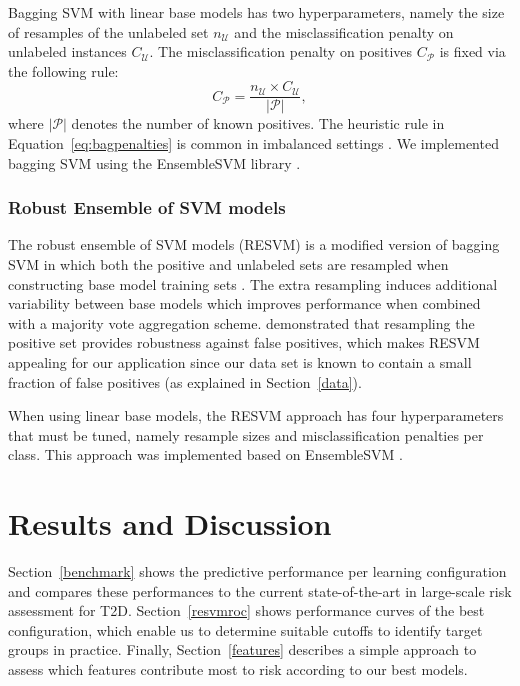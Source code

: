 \documentclass[twoside,11pt]{article}
\begin{document}
Bagging SVM with linear base models has two hyperparameters, namely the size of resamples of the unlabeled set $n_\mathcal{U}$ and the misclassification penalty on unlabeled instances $C_\mathcal{U}$. The misclassification penalty on positives $C_\mathcal{P}$ is fixed via the following rule:
\begin{equation}
C_{\mathcal{P}} = \frac{n_{\mathcal{U}} \times C_{\mathcal{U}}}{|\mathcal{P}|}, \label{eq:bagpenalties}
\end{equation}
where $|\mathcal{P}|$ denotes the number of known positives. The heuristic rule in Equation~\ref{eq:bagpenalties} is common in imbalanced settings \citep{cawley2006leave,daemen2009kernel}. We implemented bagging SVM using the EnsembleSVM library \citep{JMLR:v15:claesen14a}.

\subsubsection{Robust Ensemble of SVM models}
The robust ensemble of SVM models (RESVM) is a modified version of bagging SVM in which both the positive and unlabeled sets are resampled when constructing base model training sets \citep{Claesen2015resvm}. The extra resampling induces additional variability between base models which improves performance when combined with a majority vote aggregation scheme. \citet{Claesen2015resvm} demonstrated that resampling the positive set provides robustness against false positives, which makes RESVM appealing for our application since our data set is known to contain a small fraction of false positives (as explained in Section~\ref{data}).

When using linear base models, the RESVM approach has four hyperparameters that must be tuned, namely resample sizes and misclassification penalties per class. This approach was implemented based on EnsembleSVM \citep{JMLR:v15:claesen14a}.


%
%

\section{Results and Discussion}
Section~\ref{benchmark} shows the predictive performance per learning configuration and compares these performances to the current state-of-the-art in large-scale risk assessment for T2D. Section~\ref{resvmroc} shows performance curves of the best configuration, which enable us to determine suitable cutoffs to identify target groups in practice. Finally, Section~\ref{features} describes a simple approach to assess which features contribute most to risk according to our best models.
\end{document}
